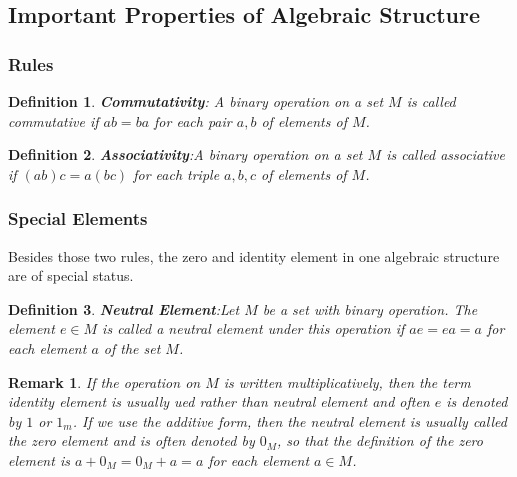 \documentclass[a4paper]{book}
\newtheorem{definition}{Definition}[section]
\newtheorem{remark}{Remark}[section]
\begin{document}
    \subsection{Important Properties of Algebraic Structure}

      \subsubsection{Rules}

      \begin{definition}
        \textbf{Commutativity}: A binary operation on a set $M$ is called commutative if $ab = ba$ for
        each pair $a,b$ of elements of $M$.\cite{dixon2011algebra}
      \end{definition}

      \begin{definition}
        \textbf{Associativity}:A binary operation on a set $M$ is called associative if $(ab)c =
        a(bc)$ for each triple $a,b,c$ of elements of
        $M$.\cite{dixon2011algebra}
      \end{definition}

      \subsubsection{Special Elements}

      Besides those two rules, the zero and identity element in one algebraic
      structure are of special status.

      \begin{definition}
        \textbf{Neutral Element}:Let $M$ be a set with binary operation. The
        element $e \in M$ is called a neutral element under this operation if
        $ae = ea = a$ for each element $a$ of the set
        $M$.\cite{dixon2011algebra}
      \end{definition}

      \begin{remark}
        If the operation on $M$ is written multiplicatively, then the term
        \textit{identity element} is usually ued rather than neutral element
        and often $e$ is denoted by $1$ or $1_m$. If we use the additive form,
        then the neutral element is usually called the \textit{zero element}
        and is often denoted by $0_M$, so that the definition of the zero
        element is $ a + 0_M = 0_M + a = a$ for each element $a \in
        M$.\cite{dixon2011algebra}
      \end{remark}
\end{document}
